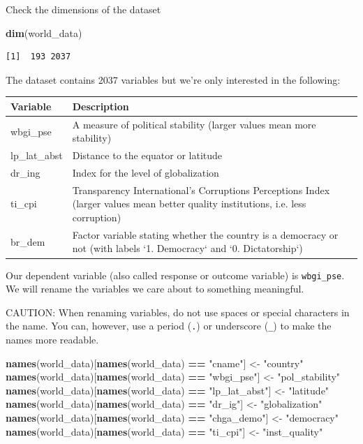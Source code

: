 \documentclass[]{article}
\newenvironment{Shaded}{\begin{snugshade}}{\end{snugshade}}
\newcommand{\KeywordTok}[1]{\textcolor[rgb]{0.13,0.29,0.53}{\textbf{#1}}}
\newcommand{\NormalTok}[1]{#1}
\newcommand{\OperatorTok}[1]{\textcolor[rgb]{0.81,0.36,0.00}{\textbf{#1}}}
\newcommand{\StringTok}[1]{\textcolor[rgb]{0.31,0.60,0.02}{#1}}
\begin{document}
Check the dimensions of the dataset

\begin{Shaded}
\begin{Highlighting}[]
\KeywordTok{dim}\NormalTok{(world_data)}
\end{Highlighting}
\end{Shaded}

\begin{verbatim}
[1]  193 2037
\end{verbatim}

The dataset contains 2037 variables but we're only interested in the following:

\begin{tabular}{l|l}
\hline
Variable & Description\\
\hline
wbgi\_pse & A measure of political stability (larger values mean more stability)\\
\hline
lp\_lat\_abst & Distance to the equator or latitude\\
\hline
dr\_ing & Index for the level of globalization\\
\hline
ti\_cpi & Transparency International's Corruptions Perceptions Index (larger values mean better quality institutions, i.e. less corruption)\\
\hline
br\_dem & Factor variable stating whether the country is a democracy or not (with labels `1. Democracy` and `0. Dictatorship`)\\
\hline
\end{tabular}

Our dependent variable (also called response or outcome variable) is \texttt{wbgi\_pse}. We will rename the variables we care about to something meaningful.

CAUTION: When renaming variables, do not use spaces or special characters in the name. You can, however, use a period (\texttt{.}) or underscore (\texttt{\_}) to make the names more readable.

\begin{Shaded}
\begin{Highlighting}[]
\KeywordTok{names}\NormalTok{(world_data)[}\KeywordTok{names}\NormalTok{(world_data) }\OperatorTok{==}\StringTok{ "cname"}\NormalTok{] <-}\StringTok{ "country"}
\KeywordTok{names}\NormalTok{(world_data)[}\KeywordTok{names}\NormalTok{(world_data) }\OperatorTok{==}\StringTok{ "wbgi_pse"}\NormalTok{] <-}\StringTok{ "pol_stability"}
\KeywordTok{names}\NormalTok{(world_data)[}\KeywordTok{names}\NormalTok{(world_data) }\OperatorTok{==}\StringTok{ "lp_lat_abst"}\NormalTok{] <-}\StringTok{ "latitude"}
\KeywordTok{names}\NormalTok{(world_data)[}\KeywordTok{names}\NormalTok{(world_data) }\OperatorTok{==}\StringTok{ "dr_ig"}\NormalTok{] <-}\StringTok{ "globalization"}
\KeywordTok{names}\NormalTok{(world_data)[}\KeywordTok{names}\NormalTok{(world_data) }\OperatorTok{==}\StringTok{ "chga_demo"}\NormalTok{] <-}\StringTok{ "democracy"}
\KeywordTok{names}\NormalTok{(world_data)[}\KeywordTok{names}\NormalTok{(world_data) }\OperatorTok{==}\StringTok{ "ti_cpi"}\NormalTok{] <-}\StringTok{ "inst_quality"}
\end{Highlighting}
\end{Shaded}
\end{document}
